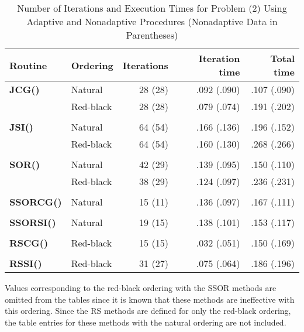  
\begin{table}
\begin{center}
\begin{tabular}{llrrr} \hline 
 Routine & Ordering & Iterations & Iteration time & Total time \\ \hline
 {\bf JCG()}    & Natural   & 28 (28) & .092 (.090) & .107 (.090) \\
                & Red-black & 28 (28) & .079 (.074) & .191 (.202) \\
                &           &         &             &             \\
 {\bf JSI()}    & Natural   & 64 (54) & .166 (.136) & .196 (.152) \\
                & Red-black & 64 (54) & .160 (.130) & .268 (.266) \\
                &           &         &             &             \\
 {\bf SOR()}    & Natural   & 42 (29) & .139 (.095) & .150 (.110) \\
                & Red-black & 38 (29) & .124 (.097) & .236 (.231) \\
                &           &         &             &             \\
 {\bf SSORCG()} & Natural   & 15 (11) & .136 (.097) & .167 (.111) \\
                &           &         &             &             \\
 {\bf SSORSI()} & Natural   & 19 (15) & .138 (.101) & .153 (.117) \\
                &           &         &             &             \\
 {\bf RSCG()}   & Red-black & 15 (15) & .032 (.051) & .150 (.169) \\
                &           &         &             &             \\
 {\bf RSSI()}   & Red-black & 31 (27) & .075 (.064) & .186 (.196) \\
              \hline
\end{tabular}
\caption{Number of Iterations and Execution Times for
         Problem (2) Using Adaptive and Nonadaptive
         Procedures (Nonadaptive Data in Parentheses)}
\label{prob2}
\end{center}
\end{table}
 
Values corresponding to the red-black ordering with the SSOR methods
are omitted from the tables since it is known that these methods are
ineffective with this ordering.  Since the RS methods are defined for
only the red-black ordering, the table entries for these methods with
the natural ordering are not included. 
 
